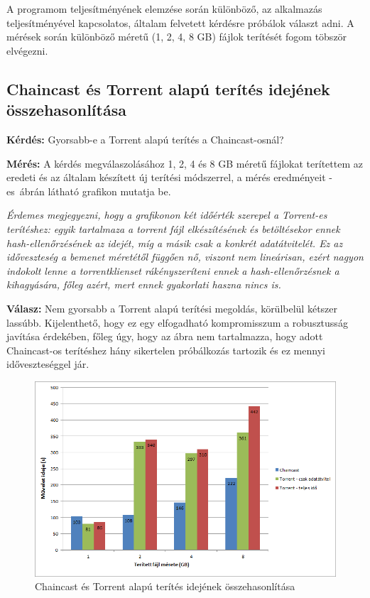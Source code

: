 A programom teljesítményének elemzése során különböző, az alkalmazás teljesítményével kapcsolatos, általam felvetett kérdésre próbálok választ adni. A mérések során különböző méretű (1, 2, 4, 8 GB) fájlok terítését fogom töbször elvégezni.

%
\subsection{Chaincast és Torrent alapú terítés idejének összehasonlítása}
%
\textbf{Kérdés:} Gyorsabb-e a Torrent alapú terítés a Chaincast-osnál?

\textbf{Mérés:} A kérdés megválaszolásához 1, 2, 4 és 8 GB méretű fájlokat terítettem az eredeti és az általam készített új terítési módszerrel, a mérés eredményeit  -es~ábrán látható grafikon mutatja be.


\textit{Érdemes megjegyezni, hogy a grafikonon két időérték szerepel a Torrent-es terítéshez: egyik tartalmaza a torrent fájl elkészítésének és betöltésekor ennek hash-ellenőrzésének az idejét, míg a másik csak a konkrét adatátvitelét. Ez az időveszteség a bemenet méretétől függően nő, viszont nem lineárisan, ezért nagyon indokolt lenne a torrentklienset rákényszeríteni ennek a hash-ellenőrzésnek a kihagyására, főleg azért, mert ennek gyakorlati haszna nincs is.}

\textbf{Válasz:} Nem gyorsabb a Torrent alapú terítési megoldás, körülbelül kétszer lassúbb. Kijelenthető, hogy ez egy elfogadható kompromisszum a robusztusság javítása érdekében, főleg úgy, hogy az ábra nem tartalmazza, hogy adott Chaincast-os terítéshez hány sikertelen próbálkozás tartozik és ez mennyi időveszteséggel jár. 

\begin{figure}[ht]
\centering
\includegraphics[width=150mm, keepaspectratio]{figures/Perf_chaincast_torrent_comparison.png}
\caption{Chaincast és Torrent alapú terítés idejének összehasonlítása}
\label{fig:chaincasttorrrentcomparison}
\end{figure}

